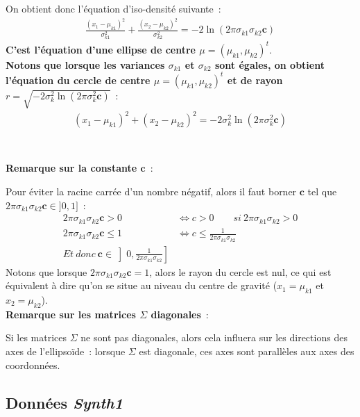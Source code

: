 \documentclass[a4paper,10pt]{report}
\begin{document}
On obtient donc l'équation d'iso-densité suivante~:
\begin{align*}
	\frac{(x_1 - \mu_{k1})^2}{\sigma_{k1}^2} + \frac{(x_2 - \mu_{k2})^2}{\sigma_{k2}^2}
		= -2 \ln (2\pi \sigma_{k1} \sigma_{k2}\textbf{c})
\end{align*}
\textbf{C'est l'équation d'une ellipse de centre $\mu = (\mu_{k1}, \mu_{k2})^t$}.\\


\textbf{Notons que lorsque les variances $\sigma_{k1}$ et $\sigma_{k2}$ sont égales, on obtient l'équation du cercle de centre $\mu = (\mu_{k1}, \mu_{k2})^t$ et de rayon $r = \sqrt{-2 \sigma_k^2 \ln (2\pi \sigma_k^2 \textbf{c})}$}~:
\begin{align*}
(x_1 - \mu_{k1})^2 + (x_2 - \mu_{k2})^2 = -2 \sigma_k^2 \ln (2\pi \sigma_k^2 \textbf{c})\\
\end{align*}\\
~\\


\textbf{Remarque sur la constante $\textbf{c}$}~:

Pour éviter la racine carrée d'un nombre négatif, alors il faut borner $\textbf{c}$ tel que $2\pi\sigma_{k1}\sigma_{k2}\textbf{c} \in ]0,1]$~:
\begin{align*}
	2\pi\sigma_{k1}\sigma_{k2}\textbf{c} > 0 &\Leftrightarrow c > 0 \qquad si\ 2\pi\sigma_{k1}\sigma_{k2} > 0 \\
	2\pi\sigma_{k1}\sigma_{k2}\textbf{c} \leq 1 &\Leftrightarrow c \leq \frac{1}{2\pi\sigma_{k1}\sigma_{k2}} \\
	Et\ donc\ \textbf{c} \in \left]0, \frac{1}{2\pi\sigma_{k1}\sigma_{k2}}\right]
\end{align*}
Notons que lorsque $2\pi\sigma_{k1}\sigma_{k2}\textbf{c} = 1$, alors le rayon du cercle est nul, ce qui est équivalent à dire qu'on se situe au niveau du centre de gravité ($x_1 = \mu_{k1}$ et $x_2 = \mu_{k2}$).\\


\textbf{Remarque sur les matrices $\Sigma$ diagonales}~:

Si les matrices $\Sigma$ ne sont pas diagonales, alors cela influera sur les directions des axes de l'ellipsoïde~: lorsque $\Sigma$ est diagonale, ces axes sont parallèles aux axes des coordonnées.

\subsection{Données \textit{Synth1}}
\end{document}
